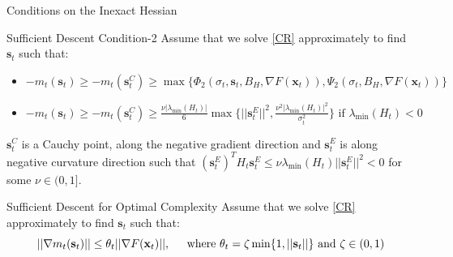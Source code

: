 \documentclass[10pt]{beamer}
\newcommand{\g}{\nabla}
\newcommand{\xbold}{\mathbf{x}}
\newcommand{\sbold}{\mathbf{s}}
\newcommand{\mineig}{\lambda_{\min}}
\begin{document}
\begin{frame}{Conditions on the Inexact Hessian}
\begin{alertblock}{Sufficient Descent Condition-2}
Assume that we solve \ref{CR} approximately to find \(\sbold_{t}\) such that:
\begin{itemize}
\item \(-m_{t}(\sbold_{t}) \geq -m_{t}(\sbold_{t}^{C}) \geq \max\lbrace\Phi_{2}(\sigma_{t}, \sbold_{t}, B_{H}, \g F(\xbold_{t})), \Psi_{2}(\sigma_{t}, B_{H}, \g F(\xbold_{t}))\rbrace\)
\item \(-m_{t}(\sbold_{t}) \geq -m_{t}(\sbold_{t}^{C}) \geq \frac{\nu|\mineig(H_{t})|}{6} \max\lbrace ||\sbold_{t}^{E}||^{2}, \frac{\nu^{2}|\mineig(H_{t})|^{2}}{\sigma_{t}^{2}}\rbrace \text{ if } \mineig(H_{t}) < 0\)
\end{itemize}
\(\sbold_{t}^{C}\) is a Cauchy point, along the negative gradient direction and \(\sbold_{t}^{E}\) is along negative curvature direction such that \((\sbold_{t}^{E})^{T} H_{t} \sbold_{t}^{E} \leq \nu\mineig(H_{t})||\sbold_{t}^{E}||^{2} < 0\) for some \(\nu \in (0, 1]\).
\end{alertblock}
\pause
\begin{alertblock}{Sufficient Descent for Optimal Complexity}
Assume that we solve \ref{CR} approximately to find \(\sbold_{t}\) such that:
\[||\nabla m_{t}(\sbold_{t})|| \leq \theta_{t}||\g F(\xbold_{t})||, \hspace{4mm} \text{ where }\theta_{t} = \zeta\min\{1, ||\sbold_{t}||\} \text{ and } \zeta \in (0, 1) \]
\end{alertblock}
\end{frame}
\end{document}
